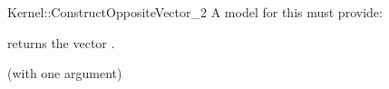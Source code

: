 \begin{ccRefFunctionObjectConcept}{Kernel::ConstructOppositeVector_2}
A model for this must provide:


{returns the vector .}

\ccRefines
{} (with one argument)

\ccSeeAlso
{} \\

\end{ccRefFunctionObjectConcept}
